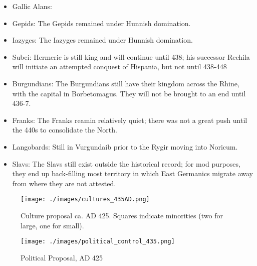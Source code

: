 \documentclass{article}
\begin{document}
\begin{itemize}
		\item Gallic Alans:\newline
		
		
		\item Gepids:\newline
		The Gepids remained under Hunnish domination.
		
		\item Iazyges:\newline
		The Iazyges remained under Hunnish domination.
		
		\item Subei:\newline
		Hermeric is still king and will continue until 438; his successor Rechila will initiate an attempted conquest of Hispania, but not until 438-448
		
		\item Burgundians:\newline
		The Burgundians still have their kingdom across the Rhine, with the capital in Borbetomagus.
		They will not be brought to an end until 436-7.
		
		\item Franks:\newline
		The Franks reamin relatively quiet; there was not a great push until the 440s to consolidate the North.
		
		\item Langobards:\newline
		Still in Vurgundaib prior to the Rygir moving into Noricum.
		
		\item Slavs:\newline
		The Slavs still exist outside the historical record; for mod purposes, they end up back-filling most territory in which East Germanics migrate away from where they are not attested.
	\end{itemize}
	
	\newpage
	
	\begin{figure}[h!]
		\centering
		\texttt{[image: ./images/cultures\_435AD.png]}
		\caption{Culture proposal ca. AD 425. Squares indicate minorities (two for large, one for small).}
	\end{figure}
	
	\begin{figure}[h!]
		\centering
		\texttt{[image: ./images/political\_control\_435.png]}
		\caption{Political Proposal, AD 425}
	\end{figure}
	
\end{document}
